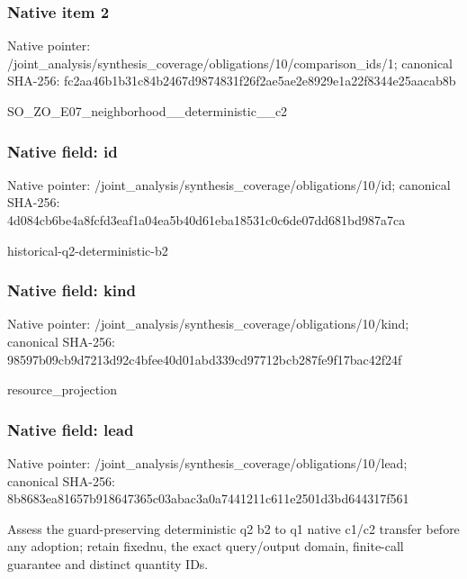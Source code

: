 \documentclass[10pt,a4paper]{article}
\begin{document}
\subsubsection{Native item 2}
Native pointer: /joint\_\allowbreak{}analysis/synthesis\_\allowbreak{}coverage/obligations/10/comparison\_\allowbreak{}ids/1; canonical SHA-256: fc2aa46b1b31c84b2467d9874831f26f2ae5ae2e8929e1a22f8344e25aacab8b

\begingroup\raggedright\sloppy SO\_\allowbreak{}ZO\_\allowbreak{}E07\_\allowbreak{}neighborhood\_\allowbreak{}\_\allowbreak{}deterministic\_\allowbreak{}\_\allowbreak{}c2\par\endgroup

\subsubsection{Native field: id}
Native pointer: /joint\_\allowbreak{}analysis/synthesis\_\allowbreak{}coverage/obligations/10/id; canonical SHA-256: 4d084cb6be4a8fcfd3eaf1a04ea5b40d61eba18531c0c6de07dd681bd987a7ca

\begingroup\raggedright\sloppy historical-q2-deterministic-b2\par\endgroup

\subsubsection{Native field: kind}
Native pointer: /joint\_\allowbreak{}analysis/synthesis\_\allowbreak{}coverage/obligations/10/kind; canonical SHA-256: 98597b09cb9d7213d92c4bfee40d01abd339cd97712bcb287fe9f17bac42f24f

\begingroup\raggedright\sloppy resource\_\allowbreak{}projection\par\endgroup

\subsubsection{Native field: lead}
Native pointer: /joint\_\allowbreak{}analysis/synthesis\_\allowbreak{}coverage/obligations/10/lead; canonical SHA-256: 8b8683ea81657b918647365c03abac3a0a7441211c611e2501d3bd644317f561

\begingroup\raggedright\sloppy Assess the guard-preserving deterministic q2 b2 to q1 native c1/\allowbreak{}c2 transfer before any adoption;\allowbreak{} retain fixednu,\allowbreak{} the exact query/\allowbreak{}output domain,\allowbreak{} finite-call guarantee and distinct quantity IDs.\par\endgroup
\end{document}
